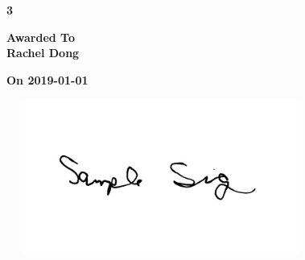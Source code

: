 \documentclass{letter}
\begin{document}
\thispagestyle{empty}
\begin{landscape}
\begin{center}

\Huge \textbf{3\\[0.5in]} \par

\large \textbf{Awarded To}
\Huge \textbf{\\Rachel Dong\\[0.4in]} \par
\large \textbf{On 2019-01-01}

\includegraphics[width=4in, height=2in]{./signature.jpg}\\[1mm]
\vspace{-2cm}{\rule[0.6in]{4in}{.1pt}}

\end{center}
\end{landscape}
\end{document}
